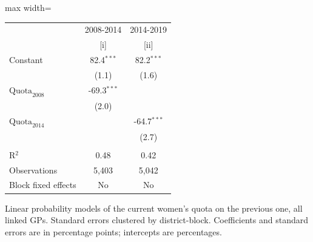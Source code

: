 
\begingroup
\centering
\scriptsize
\begin{adjustbox}{max width=\linewidth}
   \begin{threeparttable}[b]
      \begin{tabular}{lcc}
         \toprule
                                & 2008-2014     & 2014-2019 \\
                                & [i]           & [ii]\\
         \midrule
         Constant               & 82.4$^{***}$  & 82.2$^{***}$\\
                                & (1.1)         & (1.6)\\
         $\text{Quota}_{2008}$  & -69.3$^{***}$ &   \\
                                & (2.0)         &   \\
         $\text{Quota}_{2014}$  &               & -64.7$^{***}$\\
                                &               & (2.7)\\
          \\
         R$^2$                  & 0.48          & 0.42\\
         Observations           & 5,403         & 5,042\\
         Block fixed effects    & No            & No\\
         \bottomrule
      \end{tabular}

      \begin{tablenotes}
         \item Linear probability models of the current women's quota on the previous one, all linked GPs. Standard errors clustered by district-block. Coefficients and standard errors are in percentage points; intercepts are percentages.
      \end{tablenotes}
   \end{threeparttable}
\end{adjustbox}
\par\endgroup


